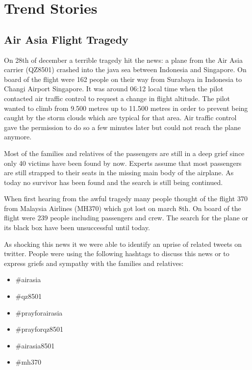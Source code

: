 \chapter{Trend Stories}
\label{cha:trend-stories}

\section{Air Asia Flight Tragedy}
\label{sec:air-asia-flight-tragedy}

On 28th of december a terrible tragedy hit the news: a plane from the Air Asia carrier (QZ8501) crashed into the java sea between Indonesia and Singapore. On board of the flight were 162 people on their way from Surabaya in Indonesia to Changi Airport Singapore. It was around 06:12 local time when the pilot contacted air traffic control to request a change in flight altitude. The pilot wanted to  climb from 9.500 metres up to 11.500 metres in order to prevent being caught by the storm clouds which are typical for that area. Air traffic control gave the permission to do so a few minutes later but could not reach the plane anymore.\cite{bbc2014flight}

Most of the families and relatives of the passengers are still in a deep grief since only 40 victims have been found by now. Experts assume that most passengers are still strapped to their seats in the missing main body of the airplane. As today no survivor has been found and the search is still being continued.\cite{bbc2014air}

When first hearing from the awful tragedy many people thought of the flight 370 from Malaysia Airlines (MH370) which got lost on march 8th. On board of the flight were 239 people including passengers and crew. The search for the plane or its black box have been unsuccessful until today.\cite{nbc2014by}

As shocking this news it we were able to identify an uprise of related tweets on twitter. People were using the following hashtags to discuss this news or to express griefs and sympathy with the families and relatives:

\begin{multicols}{2}
\begin{itemize}[label={}]
	\item \#airasia
	\item \#qz8501
    \item \#prayforairasia
    \item \#prayforqz8501
    \item \#airasia8501
    \item \#mh370
\end{itemize}
\end{multicols}

